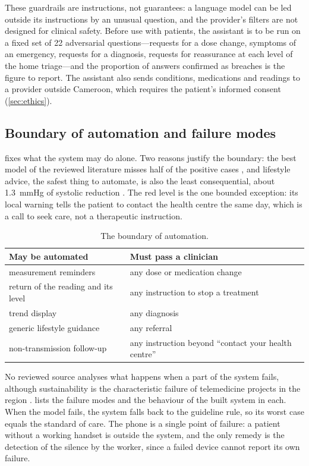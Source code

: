 \documentclass[11pt,a4paper,oneside]{report}
\begin{document}
These guardrails are instructions, not guarantees: a language model can be led outside its instructions by an unusual question, and the provider's filters are not designed for clinical safety. Before use with patients, the assistant is to be run on a fixed set of 22 adversarial questions---requests for a dose change, symptoms of an emergency, requests for a diagnosis, requests for reassurance at each level of the home triage---and the proportion of answers confirmed as breaches is the figure to report. The assistant also sends conditions, medications and readings to a provider outside Cameroon, which requires the patient's informed consent (\cref{sec:ethics}).

\subsection{Boundary of automation and failure modes}\label{sec:safety}\label{sec:failure}

 fixes what the system may do alone. Two reasons justify the boundary: the best model of the reviewed literature misses half of the positive cases \parencite{mendoza2025}, and lifestyle advice, the safest thing to automate, is also the least consequential, about 1.3~mmHg of systolic reduction \parencite{who2023hypertension}. The red level is the one bounded exception: its local warning tells the patient to contact the health centre the same day, which is a call to seek care, not a therapeutic instruction.

\begin{table}[htbp]
\centering\small
\caption{The boundary of automation.}\label{tab:automation-boundary}
\begin{tabularx}{\textwidth}{@{}X X@{}}
\toprule
\textbf{May be automated} & \textbf{Must pass a clinician} \\
\midrule
measurement reminders & any dose or medication change \\
return of the reading and its level & any instruction to stop a treatment \\
trend display & any diagnosis \\
generic lifestyle guidance & any referral \\
non-transmission follow-up & any instruction beyond ``contact your health centre'' \\
\bottomrule
\end{tabularx}
\end{table}

No reviewed source analyses what happens when a part of the system fails, although sustainability is the characteristic failure of telemedicine projects in the region \parencite{dodoo2022}.  lists the failure modes and the behaviour of the built system in each. When the model fails, the system falls back to the guideline rule, so its worst case equals the standard of care. The phone is a single point of failure: a patient without a working handset is outside the system, and the only remedy is the detection of the silence by the worker, since a failed device cannot report its own failure.
\end{document}
